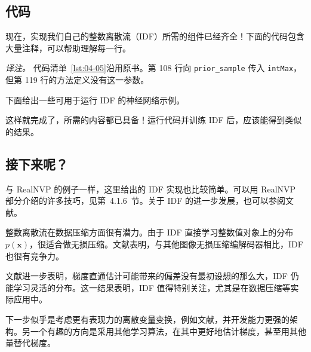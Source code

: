 \subsection{代码}

现在，实现我们自己的整数离散流（IDF）所需的组件已经齐全！下面的代码包含大量注释，可以帮助理解每一行。



\emph{译注。} 代码清单~\ref{lst:04-05}沿用原书。第 108 行向 \texttt{prior\_sample} 传入 \texttt{intMax}，但第 119 行的方法定义没有这一参数。

下面给出一些可用于运行 IDF 的神经网络示例。


这样就完成了，所需的内容都已具备！运行代码并训练 IDF 后，应该能得到类似的结果。


\subsection{接下来呢？}

与 RealNVP 的例子一样，这里给出的 IDF 实现也比较简单。可以用 RealNVP 部分介绍的许多技巧，见第~4.1.6~节。关于 IDF 的进一步发展，也可以参阅文献。

整数离散流在数据压缩方面很有潜力。由于 IDF 直接学习整数值对象上的分布 $p(\mathbf{x})$，很适合做无损压缩。文献表明，与其他图像无损压缩编解码器相比，IDF 也很有竞争力。

文献进一步表明，梯度直通估计可能带来的偏差没有最初设想的那么大，IDF 仍能学习灵活的分布。这一结果表明，IDF 值得特别关注，尤其是在数据压缩等实际应用中。

下一步似乎是考虑更有表现力的离散变量变换，例如文献，并开发能力更强的架构。另一个有趣的方向是采用其他学习算法，在其中更好地估计梯度，甚至用其他量替代梯度。

\FloatBarrier


